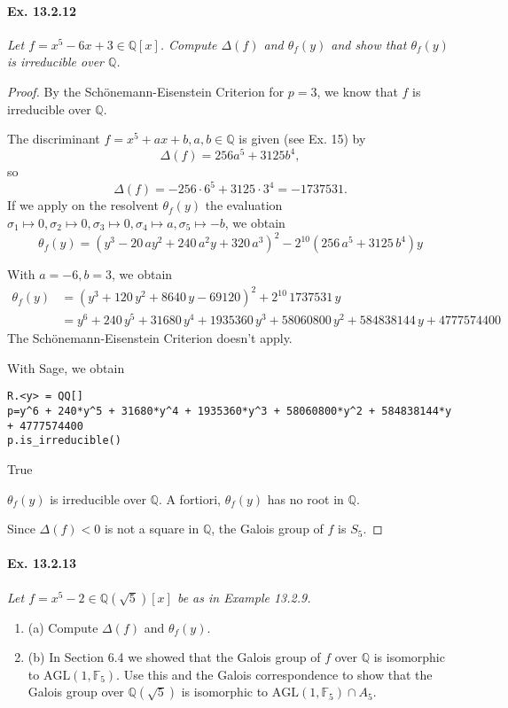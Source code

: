 \documentclass[11pt,a4paper]{article}
\newcommand{\be} {\begin{enumerate}}
\newcommand{\ee} {\end{enumerate}}
\newcommand{\Q}{\mathbb{Q}}
\newcommand{\F}{\mathbb{F}}
\begin{document}
\paragraph{Ex. 13.2.12}

{\it Let $f = x^5 - 6x+3 \in \Q[x]$. Compute $\Delta(f)$ and $\theta_f(y)$ and show that $\theta_f(y)$ is irreducible over $\Q$.
}

\begin{proof}
By the Sch\"onemann-Eisenstein Criterion for $p=3$, we know that $f$ is irreducible over $\Q$.

The discriminant $f = x^5 +ax+b, a,b\in \Q$ is given (see Ex. 15) by
$$\Delta(f) = 256a^5+3125b^4,$$
so 
$$\Delta(f) = -256 \cdot 6^5 + 3125 \cdot 3^4 = -1737531.$$
If we apply on the resolvent $\theta_f(y)$ the evaluation $\sigma_1\mapsto 0, \sigma_2\mapsto 0, \sigma_3\mapsto 0, \sigma_4 \mapsto a, \sigma_5 \mapsto -b$, we obtain
$$\theta_f(y) =  {\left(y^{3} - 20 \, a y^{2}  + 240 \,a^{2} y + 320 \, a^{3} \right)}^{2} - 2^{10}(256 \, a^{5}  + 3125 \, b^{4}) y $$

With $a = -6, b = 3$, we obtain
\begin{align*}
\theta_f(y) &={\left(y^{3} + 120 \, y^{2} + 8640 \, y - 69120\right)}^{2} + 2^{10}\, 1737531 \, y\\
&= y^{6} + 240 \, y^{5} + 31680 \, y^{4} + 1935360 \, y^{3} + 58060800 \,
y^{2} + 584838144 \, y + 4777574400
\end{align*}
The Sch\"onemann-Eisenstein Criterion doesn't apply.  

With Sage, we obtain
\begin{verbatim}
R.<y> = QQ[]
p=y^6 + 240*y^5 + 31680*y^4 + 1935360*y^3 + 58060800*y^2 + 584838144*y + 4777574400
p.is_irreducible()
\end{verbatim}
\begin{center}
True
\end{center}

$\theta_f(y)$ is irreducible over $\Q$. A fortiori, $\theta_f(y)$ has no root in $\Q$.

Since $\Delta(f)<0$ is not a square in $\Q$, the Galois group of $f$ is $S_5$.
\end{proof}

\paragraph{Ex. 13.2.13}

{\it Let $f = x^5 - 2 \in \Q(\sqrt{5})[x]$ be as in Example 13.2.9.
\be
\item[(a)] Compute $\Delta(f)$ and $\theta_f(y)$.
\item[(b)] In Section 6.4 we showed that the Galois group of $f$ over $\Q$ is isomorphic to $\mathrm{AGL}(1,\F_5)$. Use this and the Galois correspondence to show that the Galois group over $\Q(\sqrt{5})$ is isomorphic to $\mathrm{AGL}(1,\F_5) \cap A_5$.
\ee
}
\end{document}
